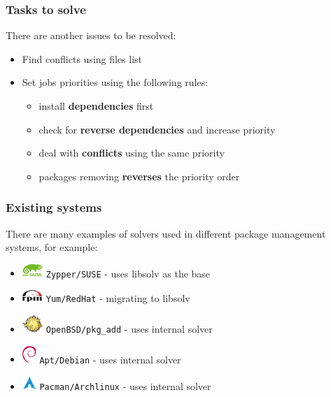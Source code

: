 \documentclass{beamer}
\begin{document}
\begin{frame}
\frametitle{Tasks to solve}
There are another issues to be resolved:
\begin{itemize}
  \item Find conflicts using files list
  \item<2-> Set jobs priorities using the following rules:
  \begin{itemize}
    \item<3-> install \textbf{dependencies} first
    \item<4-> check for \textbf{reverse dependencies} and increase priority
    \item<5-> deal with \textbf{conflicts} using the same priority
    \item<6-> packages removing \textbf{reverses} the priority order
  \end{itemize}
\end{itemize}
\end{frame}

\begin{frame}
\frametitle{Existing systems}

There are many examples of solvers used in different package management systems,
for example:
\begin{itemize}
  \item \includegraphics[width=22pt]{suse.pdf} \hspace{5pt} \texttt{Zypper/SUSE}
  - uses libsolv as the base
  \item \includegraphics[width=22pt]{rpm.pdf} \hspace{5pt} \texttt{Yum/RedHat} -
  migrating to libsolv
  \item \includegraphics[width=22pt]{puf.pdf} \hspace{5pt}
  \texttt{OpenBSD/pkg\_add} - uses internal solver
  \item \includegraphics[width=15pt]{debian.pdf} \hspace{12pt}
  \texttt{Apt/Debian} - uses internal solver
  \item \includegraphics[width=15pt]{arch.pdf} \hspace{12pt}
  \texttt{Pacman/Archlinux} - uses internal solver
\end{itemize}

\end{frame}
\end{document}
